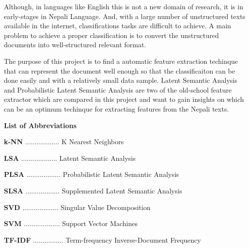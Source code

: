 \documentclass[12pt]{report}
\begin{document}
        Although, in languages like English this is not a new domain of research, it is in early-stages in Nepali Language. And, with a large 
        number of unstructured texts available in the internet, classifications tasks are difficult to achieve. A main problem to achieve a proper 
        classification is to convert the unstructured documents into well-structured relevant format. 

        The purpose of this project is to find a automatic feature extraction techinque that can represent the document well enough so that the classificaiton can be
        done easily and with a relatively small data sample. Latent Semantic Analysis and Probabilistic Latent Semantic Analysis are two of the old-school 
        feature extractor which are compared in this project and want to gain insights on which can be an optimum techinque for extracting features from the Nepali texts.
        
        


    \newpage


    \begin{center}
        \textbf{
            List of Abbreviations
        }

       



    \end{center}



    \textbf{k-NN} .................. K Nearest Neighbors


    \textbf{LSA} ................... Latent Semantic Analysis



    \textbf{PLSA} .................. Probabilistic Latent Semantic Analysis





    \textbf{SLSA} .................. Supplemented Latent Semantic Analysis



    \textbf{SVD} ................... Singular Value Decomposition



    \textbf{SVM} ................... Support Vector Machines




    \textbf{TF-IDF} ................ Term-frequency Inverse-Document Frequency
    
    
\end{document}
